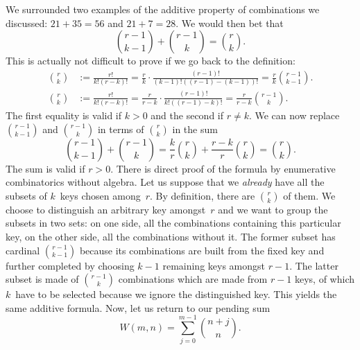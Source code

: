 We surrounded two examples of the additive property of combinations we
discussed: \(21 + 35 = 56\) and \(21 + 7 = 28\). We would then bet
that
\begin{equation*}
\binom{r-1}{k-1} + \binom{r-1}{k} = \binom{r}{k}.
\end{equation*}
This is actually not difficult to prove if we go back to the
definition:
\begin{align*}
\binom{r}{k} &:= \frac{r!}{k!(r-k)!}
              = \frac{r}{k} \cdot \frac{(r-1)!}{(k-1)!((r-1)-(k-1))!}
              = \frac{r}{k} \binom{r-1}{k-1}.\\
\binom{r}{k} &:= \frac{r!}{k!(r-k)!}
              = \frac{r}{r-k} \cdot \frac{(r-1)!}{k!((r - 1) - k)!}
              = \frac{r}{r-k} \binom{r-1}{k}.
\end{align*}
The first equality is valid if \(k > 0\) and the second if \(r \neq
k\). We can now replace \(\binom{r-1}{k-1}\) and \(\binom{r-1}{k}\) in
terms of \(\binom{r}{k}\) in the sum
\begin{equation*}
\binom{r-1}{k-1} + \binom{r-1}{k} = \frac{k}{r}\binom{r}{k}
+ \frac{r-k}{r}\binom{r}{k} = \binom{r}{k}.
\end{equation*}
The sum is valid if \(r > 0\). There is direct proof of the formula by
enumerative combinatorics without algebra. Let us suppose that we
\emph{already} have all the subsets of \(k\)~keys chosen
among~\(r\). By definition, there are \(\binom{r}{k}\) of them. We
choose to distinguish an arbitrary key amongst~\(r\) and we want to
group the subsets in two sets: on one side, all the combinations
containing this particular key, on the other side, all the
combinations without it. The former subset has cardinal
\(\binom{r-1}{k-1}\) because its combinations are built from the fixed
key and further completed by choosing \(k-1\) remaining keys amongst
\(r-1\). The latter subset is made of \(\binom{r-1}{k}\) combinations
which are made from \(r-1\) keys, of which \(k\)~have to be selected
because we ignore the distinguished key. This yields the same additive
formula. Now, let us return to our pending sum
\begin{equation*}
W(m,n) = \sum_{j=0}^{m-1}{\binom{n+j}{n}}.
\end{equation*}

